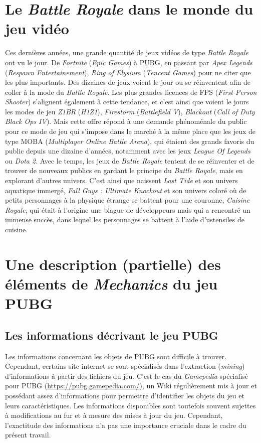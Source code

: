 \section{Le \emph{Battle Royale} dans le monde du jeu vidéo}
Ces dernières années, une grande quantité de jeux vid\'eos de type \emph{Battle Royale} ont vu le jour. De \emph{Fortnite} (\emph{Epic Games}) à PUBG, en passant par \emph{Apex Legends} (\emph{Respawn Entertainement}), \emph{Ring of Elysium} (\emph{Tencent Games}) pour ne citer que les plus importants. Des dizaines de jeux voient le jour ou se réinventent afin de coller à la mode du \emph{Battle Royale}. Les plus grandes licences de FPS (\emph{First-Person Shooter}) s'alignent également à cette tendance, et c'est ainsi que voient le jours les modes de jeu \emph{Z1BR} (\emph{H1Z1}), \emph{Firestorm} (\emph{Battlefield V}), \emph{Blackout} (\emph{Call of Duty Black Ops IV}). Mais cette offre répond à une demande phénoménale du public pour ce mode de jeu qui s'impose dans le marché à la même place que les jeux de type MOBA (\emph{Multiplayer Online Battle Arena}), qui étaient des grands favoris du public depuis une dizaine d'années, notamment avec les jeux \emph{League Of Legends} ou \emph{Dota 2}. Avec le temps, les jeux de \emph{Battle Royale} tentent de se réinventer et de trouver de nouveaux publics en gardant le principe du \emph{Battle Royale}, mais en explorant d'autres univers. C'est ainsi que naissent \emph{Last Tide} et son univers aquatique immergé, \emph{Fall Guys : Ultimate Knockout} et son univers coloré où de petits personnages à la physique étrange se battent pour une couronne, \emph{Cuisine Royale}, qui était à l'origine une blague de développeurs mais qui a rencontré un immense succès, dans lequel les personnages se battent à l'aide d'ustensiles de cuisine.

\section{Une description (partielle) des \'el\'ements de \emph{Mechanics} du jeu PUBG}
\subsection{Les informations d\'ecrivant le jeu PUBG}
Les informations concernant les objets de PUBG sont difficile à trouver.
Cependant, certains site internet se sont spécialisés dans l'extraction (\emph{mining}) d'informations à partir des fichiers du jeu.
C'est le cas du \emph{Gamepedia} spécialisé pour PUBG (\url{https://pubg.gamepedia.com/}),
un Wiki régulièrement mis à jour et possédant assez d'informations pour permettre d'identifier les objets du jeu et leurs caractéristiques.
Les informations disponibles sont toutefois souvent sujettes à modifications au fur et à mesure des mises à jour du jeu.
Cependant, l'exactitude des informations n'a pas une importance cruciale dans le cadre du pr\'esent travail.


